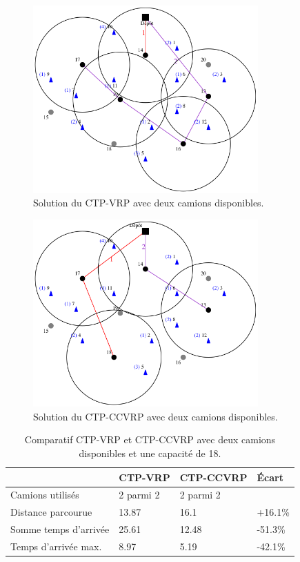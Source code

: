 \documentclass[5p,authoryear,square]{elsarticle}
\begin{document}
\begin{figure}[p]\centering
	\centerline{\includegraphics[width=3.4in]{figures/ctp_deux_camions}}
	\caption[]{Solution du CTP-VRP avec deux camions disponibles.} \label{ctp_deux_camions}
\end{figure}

\begin{figure}[p] \centering
	\centerline{\includegraphics[width=3.4in]{figures/ctpccvrp_deux_camions}}
	\caption[]{Solution du CTP-CCVRP avec deux camions disponibles.} \label{ctpccvrp_deux_camions}
\end{figure}

\begin{table}[p] \centering \begin{tabular}{@{\small}llll@{}} \toprule %
 & {\footnotesize CTP-VRP} &  {\footnotesize CTP-CCVRP} & Écart \\ \midrule
Camions utilisés & 2 parmi 2 & 2 parmi 2 &  \\
Distance parcourue & 13.87 & 16.1 & +16.1\% \\
Somme temps d'arrivée & 25.61 & 12.48 & -51.3\% \\
Temps d'arrivée max. & 8.97 & 5.19 & -42.1\% \\ \bottomrule
\end{tabular} \caption{Comparatif CTP-VRP et CTP-CCVRP avec deux camions disponibles et une capacité de 18.} \label{table_deux_camions}
\end{table}
\end{document}
